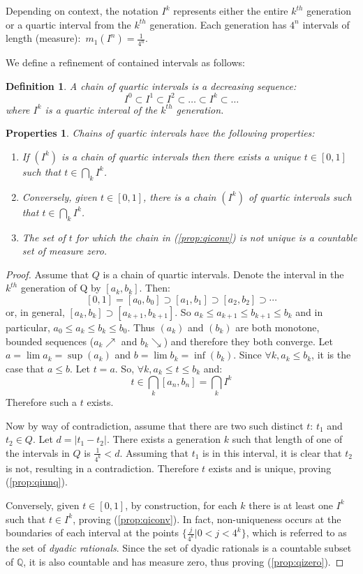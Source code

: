 \documentclass[letterpaper,12pt,fleqn,reqno]{amsart}
\newcommand{\Q}{\mathbb{Q}}
\newcommand{\uint}{[0,1]}
\newcommand{\abs}[1]{\left\lvert#1\right\rvert}
\theoremstyle{plain}
\newtheorem{defn}[thm]{Definition}
\newtheorem{prop}[thm]{Properties}
\begin{document}
Depending on context, the notation $I^k$ represents either the entire $k^{th}$
generation or a quartic interval from the $k^{th}$ generation. Each generation
has $4^n$ intervals of length (measure):\ $m_1(I^n)=\frac{1}{4^n}$.

We define a refinement of contained intervals as follows:

\begin{defn}
A chain of quartic intervals is a decreasing sequence:
\[I^0\subset I^1\subset I^2\subset\ldots\subset I^k\subset\ldots\]
where $I^k$ is a quartic interval of the $k^{th}$ generation.
\end{defn}

\begin{prop}
Chains of quartic intervals have the following properties:
\begin{enumerate}
\item\label{prop:qiunq} If $(I^k)$ is a chain of quartic intervals then there
exists a unique $t\in\uint$ such that $t\in\bigcap_kI^k$.

\item\label{prop:qiconv} Conversely, given $t\in\uint$, there is a chain $(I^k)$
of quartic intervals such that $t\in\bigcap_kI^k$.

\item\label{prop:qizero} The set of $t$ for which the chain in
(\ref{prop:qiconv}) is not unique is a countable set of measure zero.
\end{enumerate}
\end{prop}

\begin{proof}
Assume that $Q$ is a chain of quartic intervals. Denote the interval in the
$k^{th}$ generation of Q by $[a_k,b_k]$. Then:
\[[0,1]=[a_0,b_0]\supset[a_1,b_1]\supset[a_2,b_2]\supset\cdots\]
or, in general, $[a_k,b_k]\supset[a_{k+1},b_{k+1}]$. So
$a_k\le a_{k+1}\le b_{k+1}\le b_k$ and in particular, 
$a_0\le a_k\le b_k\le b_0$. Thus $(a_k)$ and $(b_k)$ are both monotone, bounded
sequences ($a_k\nearrow$ and $b_k\searrow$) and therefore they both converge.
Let $a=\lim{a_k}=\sup(a_k)$ and $b=\lim{b_k}=\inf(b_k)$. Since
$\forall{k}, a_k\le b_k$, it is the case that $a\le b$. Let $t=a$. So,
$\forall{k},a_k\le t\le b_k$ and:
\[t\in\bigcap_k[a_n,b_n]=\bigcap_kI^k\]
Therefore such a $t$ exists.

Now by way of contradiction, assume that there are two such distinct $t$: $t_1$
and $t_2\in Q$. Let $d=\abs{t_1-t_2}$. There exists a generation $k$ such that
length of one of the intervals in $Q$ is $\frac{1}{4^k}<d$. Assuming that $t_1$
is in this interval, it is clear that $t_2$ is not, resulting in a
contradiction. Therefore $t$ exists and is unique, proving (\ref{prop:qiunq}).

Conversely, given $t\in\uint$, by construction, for each $k$
there is at least one $I^k$ such that $t\in I^k$, proving (\ref{prop:qiconv}).
In fact, non-uniqueness occurs at the boundaries of each interval at the points
$\{\frac{j}{4^k}|0<j<4^k\}$, which is referred to as the set of
\emph{dyadic rationals}. Since the set of dyadic rationals is a countable
subset of $\Q$, it is also countable and has measure zero, thus proving
(\ref{prop:qizero}).
\end{proof}
\end{document}
